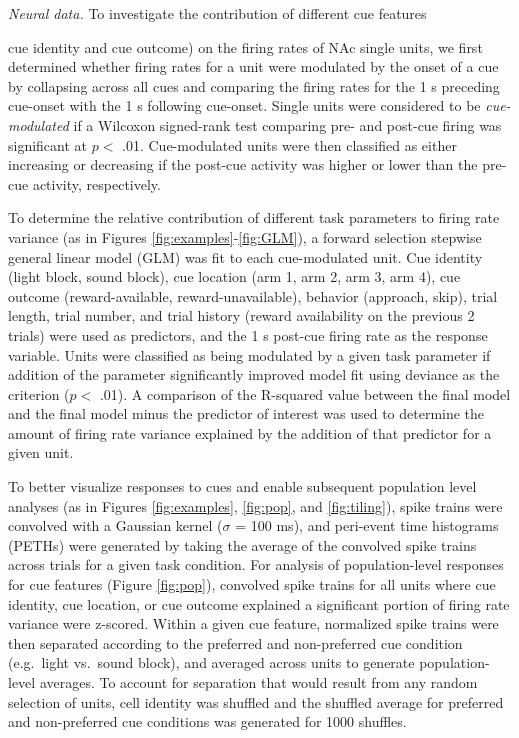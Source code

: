 \documentclass[11pt]{article}
\begin{document}
{\it Neural data.} To investigate the contribution of different cue
features {cue identity and cue outcome) on the firing rates of NAc
  single units, we first determined whether firing rates for a unit
  were modulated by the onset of a cue by collapsing across all cues
  and comparing the firing rates for the 1 s preceding cue-onset with
  the 1 s following cue-onset. Single units were considered to be {\it
    cue-modulated} if a Wilcoxon signed-rank test comparing pre- and
  post-cue firing was significant at $p <$ .01. Cue-modulated units
  were then classified as either increasing or decreasing if the
  post-cue activity was higher or lower than the pre-cue activity,
  respectively.

To determine the relative contribution of different task parameters to
firing rate variance (as in Figures \ref{fig:examples}-\ref{fig:GLM}),
a forward selection stepwise general linear model (GLM) was fit to
each cue-modulated unit. Cue identity (light block, sound block), cue
location (arm 1, arm 2, arm 3, arm 4), cue outcome (reward-available,
reward-unavailable), behavior (approach, skip), trial length, trial
number, and trial history (reward availability on the previous 2
trials) were used as predictors, and the 1 s post-cue firing rate as
the response variable. Units were classified as being modulated by a
given task parameter if addition of the parameter significantly
improved model fit using deviance as the criterion ($p <$ .01). A
comparison of the R-squared value between the final model and the
final model minus the predictor of interest was used to determine the
amount of firing rate variance explained by the addition of that
predictor for a given unit.

To better visualize responses to cues and enable subsequent population
level analyses (as in Figures \ref{fig:examples}, \ref{fig:pop}, and
\ref{fig:tiling}), spike trains were convolved with a Gaussian kernel
($\sigma$ = 100 ms), and peri-event time histograms (PETHs) were
generated by taking the average of the convolved spike trains across
trials for a given task condition. For analysis of population-level
responses for cue features (Figure \ref{fig:pop}), convolved spike
trains for all units where cue identity, cue location, or cue outcome
explained a significant portion of firing rate variance were
z-scored. Within a given cue feature, normalized spike trains were
then separated according to the preferred and non-preferred cue
condition (e.g.\ light vs.\ sound block), and averaged across units to
generate population-level averages. To account for separation that
would result from any random selection of units, cell identity was
shuffled and the shuffled average for preferred and non-preferred cue
conditions was generated for 1000 shuffles.

}
\end{document}

